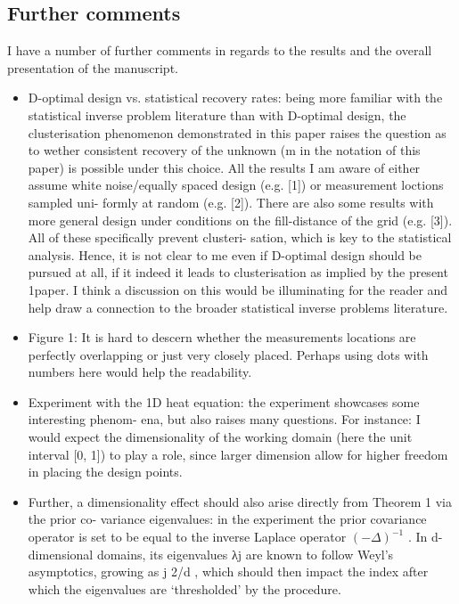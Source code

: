 \documentclass{amsart}
\begin{document}
\subsection{Further comments}
I have a number of further comments in regards to the results and the overall presentation of
the manuscript.
\begin{itemize}
\item D-optimal design vs. statistical recovery rates: being more
  familiar with the statistical inverse problem literature than with
  D-optimal design, the clusterisation phenomenon demonstrated in this
  paper raises the question as to wether consistent recovery of the
  unknown (m in the notation of this paper) is possible under this
  choice. All the results I am aware of either assume white
  noise/equally spaced design (e.g. [1]) or measurement loctions
  sampled uni- formly at random (e.g. [2]). There are also some
  results with more general design under conditions on the
  fill-distance of the grid (e.g. [3]). All of these specifically
  prevent clusteri- sation, which is key to the statistical
  analysis. Hence, it is not clear to me even if D-optimal design
  should be pursued at all, if it indeed it leads to clusterisation as
  implied by the present 1paper. I think a discussion on this would be
  illuminating for the reader and help draw a connection to the
  broader statistical inverse problems literature.

\item Figure 1: It is hard to descern whether the measurements
  locations are perfectly overlapping or just very closely
  placed. Perhaps using dots with numbers here would help the
  readability.

\item Experiment with the 1D heat equation: the experiment showcases
  some interesting phenom- ena, but also raises many questions. For
  instance: I would expect the dimensionality of the working domain
  (here the unit interval [0, 1]) to play a role, since larger
  dimension allow for higher freedom in placing the design points.

\item Further, a dimensionality effect should also arise directly from
  Theorem 1 via the prior co- variance eigenvalues: in the experiment
  the prior covariance operator is set to be equal to the inverse
  Laplace operator $(−\Delta)^{−1}$ . In d-dimensional domains, its
  eigenvalues λj are known to follow Weyl’s asymptotics, growing as j
  2/d , which should then impact the index after which the eigenvalues
  are ‘thresholded’ by the procedure.


\end{itemize}
\end{document}
